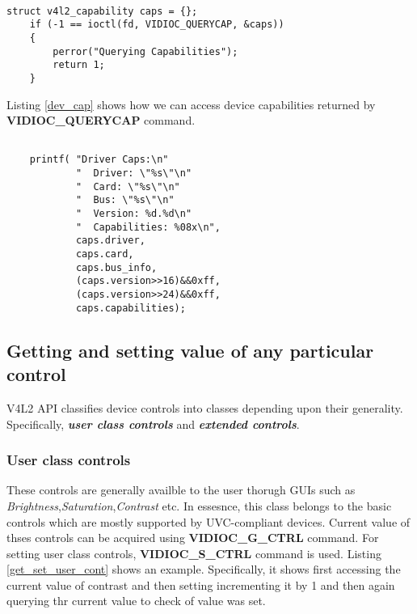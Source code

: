 \documentclass{article}
\begin{document}
\begin{lstlisting}[label=query_cap,caption=Querying device information]

struct v4l2_capability caps = {};
    if (-1 == ioctl(fd, VIDIOC_QUERYCAP, &caps))
    {
        perror("Querying Capabilities");
        return 1;
    }
\end{lstlisting}

Listing \ref{dev_cap} shows how we can access device capabilities returned by \textbf{VIDIOC\_QUERYCAP} command.
\begin{lstlisting}[label=dev_cap,caption=Accessing device capability information]

    printf( "Driver Caps:\n"
            "  Driver: \"%s\"\n"
            "  Card: \"%s\"\n"
            "  Bus: \"%s\"\n"
            "  Version: %d.%d\n"
            "  Capabilities: %08x\n",
            caps.driver,
            caps.card,
            caps.bus_info,
            (caps.version>>16)&&0xff,
            (caps.version>>24)&&0xff,
            caps.capabilities);

\end{lstlisting}
   
\subsection{Getting and setting value of any particular control}
V4L2 API classifies device controls into classes depending upon their generality. Specifically, \textbf{\textit{user class controls}} and \textbf{\textit{extended controls}}. 

\subsubsection{User class controls}
These controls are generally availble to the user thorugh GUIs such as \textit{Brightness},\textit{Saturation},\textit{Contrast} etc. In essesnce, this class belongs to the basic controls which are mostly supported by UVC-compliant devices. Current value of thses controls can be acquired using \textbf{VIDIOC\_G\_CTRL} command. For setting user class controls, \textbf{VIDIOC\_S\_CTRL} command is used. Listing \ref{get_set_user_cont} shows an example. Specifically, it shows first accessing the current value of contrast and then setting incrementing it by 1 and then again querying thr current value to check of value was set.
\end{document}
